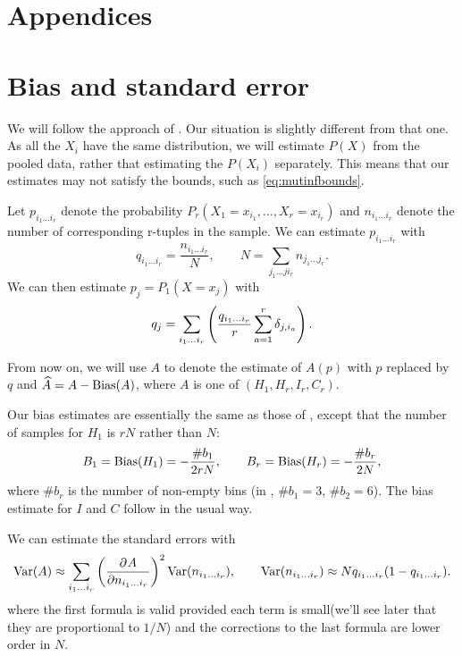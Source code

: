 \documentclass[12pt]{article}
\begin{document}
\appendix\section*{Appendices}

\section{Bias and standard error}\label{sec:stderr}

We will follow the approach of \cite{1999PhyD..125..285R}. Our situation is slightly different from that one. As all the $X_i$ have the same distribution, we will estimate $P(X)$ from the pooled data, rather that estimating the $P(X_i)$ separately. This means that our estimates may not satisfy the bounds, such as \eqref{eq:mutinfbounds}.

Let $p_{i_1\ldots i_r}$ denote the probability $P_r(X_1=x_{i_1},\ldots,X_r=x_{i_r})$ and $n_{i_1\ldots i_r}$ denote the number of corresponding r-tuples in the sample. We can estimate $p_{i_1\ldots i_r}$ with
%
\begin{equation}\label{eq:tupprob}
  q_{i_1\ldots i_r} = \frac{n_{i_1\ldots i_r}}{N},
  \qquad
  N = \sum_{j_1\ldots ji_r} n_{j_1\ldots j_r}.
\end{equation}
%
We can then estimate $p_{j}=P_1(X=x_{j})$ with
%
\begin{equation}\label{eq:singprob}
  q_j = \sum_{i_1\ldots i_r}\left (  \frac{q_{i_1\ldots i_r}}{r} \sum_{a=1}^r \delta_{j,i_a} \right ).
\end{equation}
%

From now on, we will use $A$ to denote the estimate of $A(p)$ with $p$ replaced by $q$ and $\widehat{A}=A-\operatorname{Bias}(A)$, where $A$ is one of $(H_1,H_r,I_r,C_r)$.

Our bias estimates are essentially the same as those of \cite{1999PhyD..125..285R}, except that the number of samples for $H_1$ is $rN$ rather than $N$:
%
\begin{equation}\label{eq:biasH}
  B_1 = \operatorname{Bias}(H_1) = -\frac{\#b_1}{2rN},
  \qquad
  B_r = \operatorname{Bias}(H_r) = -\frac{\#b_r}{2N},
\end{equation}
%
where $\#b_r$ is the number of non-empty bins (\eg in , $\#b_1=3$, $\#b_2=6$). The bias estimate for $I$ and $C$ follow in the usual way.

We can estimate the standard errors with
%
\begin{equation}\label{eq:stderr}
  \var(A) \approx \sum_{i_1\ldots i_r} \prn{\pdiff{A}{n_{i_1\ldots i_r}}}^2 \var(n_{i_1\ldots i_r}),
  \qquad
  \var(n_{i_1\ldots i_r}) \approx N q_{i_1\ldots i_r}(1-q_{i_1\ldots i_r}).
\end{equation}
%
where the first formula is valid provided each term is small(we'll see later that they are proportional to $1/N$) and the corrections to the last formula are lower order in $N$.
\end{document}
